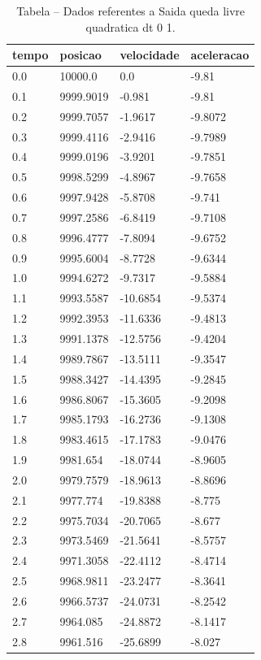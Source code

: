 \begin{table}[H]
\centering
\caption{Tabela – Dados referentes a Saida queda livre quadratica dt 0 1.}
\label{tab:saida_queda_livre_quadratica_dt_0_1}
\begin{tabular}{llll}
\toprule
tempo & posicao & velocidade & aceleracao \\
\midrule
0.0 & 10000.0 & 0.0 & -9.81 \\
0.1 & 9999.9019 & -0.981 & -9.81 \\
0.2 & 9999.7057 & -1.9617 & -9.8072 \\
0.3 & 9999.4116 & -2.9416 & -9.7989 \\
0.4 & 9999.0196 & -3.9201 & -9.7851 \\
0.5 & 9998.5299 & -4.8967 & -9.7658 \\
0.6 & 9997.9428 & -5.8708 & -9.741 \\
0.7 & 9997.2586 & -6.8419 & -9.7108 \\
0.8 & 9996.4777 & -7.8094 & -9.6752 \\
0.9 & 9995.6004 & -8.7728 & -9.6344 \\
1.0 & 9994.6272 & -9.7317 & -9.5884 \\
1.1 & 9993.5587 & -10.6854 & -9.5374 \\
1.2 & 9992.3953 & -11.6336 & -9.4813 \\
1.3 & 9991.1378 & -12.5756 & -9.4204 \\
1.4 & 9989.7867 & -13.5111 & -9.3547 \\
1.5 & 9988.3427 & -14.4395 & -9.2845 \\
1.6 & 9986.8067 & -15.3605 & -9.2098 \\
1.7 & 9985.1793 & -16.2736 & -9.1308 \\
1.8 & 9983.4615 & -17.1783 & -9.0476 \\
1.9 & 9981.654 & -18.0744 & -8.9605 \\
2.0 & 9979.7579 & -18.9613 & -8.8696 \\
2.1 & 9977.774 & -19.8388 & -8.775 \\
2.2 & 9975.7034 & -20.7065 & -8.677 \\
2.3 & 9973.5469 & -21.5641 & -8.5757 \\
2.4 & 9971.3058 & -22.4112 & -8.4714 \\
2.5 & 9968.9811 & -23.2477 & -8.3641 \\
2.6 & 9966.5737 & -24.0731 & -8.2542 \\
2.7 & 9964.085 & -24.8872 & -8.1417 \\
2.8 & 9961.516 & -25.6899 & -8.027 \\

\end{tabular}
\end{table}
